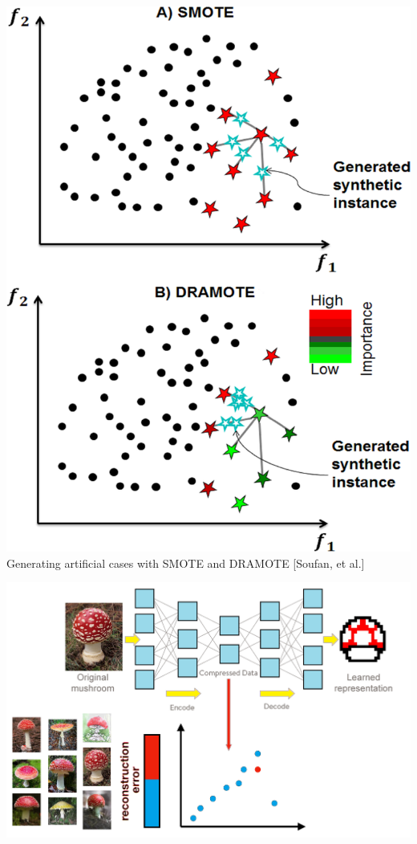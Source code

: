 \documentclass[20pt,landscape,footrule,headrule]{foils}
\begin{document}
\begin{center}\includegraphics[height=0.85\textheight]{Images/SMOTE.png} \\ Generating artificial cases with SMOTE and DRAMOTE [Soufan, et al.] 
\end{center}\newpage
\begin{center}
\includegraphics[width=\textwidth]{Images/autoencoder2.png}
\end{center}
\end{document}
